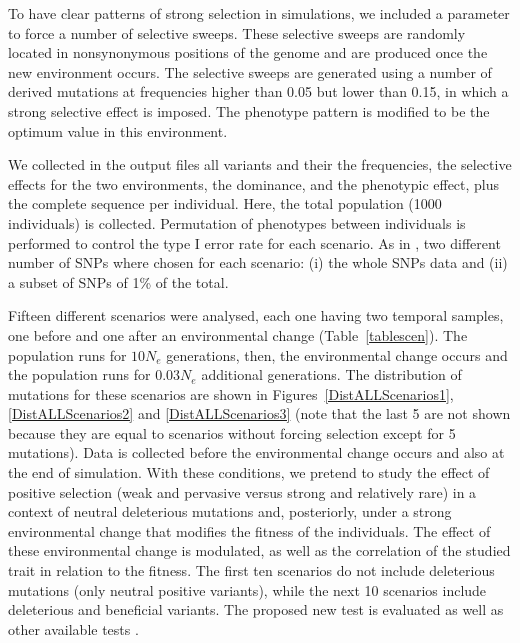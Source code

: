 \documentclass[a4paper,11pt]{article}
\begin{document}
To have clear patterns of strong selection in simulations, we included a parameter to force a number of selective sweeps. These selective sweeps are randomly located in  nonsynonymous positions of the genome and are produced once the new environment occurs. The selective sweeps are generated using a number of derived mutations at frequencies higher than 0.05 but lower than 0.15, in which a strong selective effect is imposed. The phenotype pattern is modified to be the optimum value in this environment. %

We collected in the output files all variants and their the frequencies, the selective effects for the two environments, the dominance, and the phenotypic effect, plus the complete sequence per individual. Here, the total population (1000 individuals) is collected. 
Permutation of phenotypes between individuals is performed to control the type I error rate for each scenario. As in \citep{Caballero:2015aa}, two different number of SNPs where chosen for each scenario: (i) the whole SNPs data and (ii) a subset of SNPs of 1\% of the total.

Fifteen different scenarios were analysed, each one having two temporal samples, one before and one after an environmental change (Table~\ref{tablescen}). The population runs for $10 N_e$ generations, then, the environmental change occurs and the population runs for $0.03N_e$ additional generations. The distribution of mutations for these scenarios are shown in Figures~\ref{DistALLScenarios1}, \ref{DistALLScenarios2} and \ref{DistALLScenarios3} (note that the last 5 are not shown because they are equal to scenarios without forcing selection except for 5 mutations). Data is collected before the environmental change occurs and also at the end of simulation. With these conditions, we pretend to study the effect of positive selection (weak and pervasive versus strong and relatively rare) in a context of neutral deleterious mutations and, posteriorly, under a strong environmental change that modifies the fitness of the individuals. The effect of these environmental change is modulated, as well as the correlation of the studied trait in relation to the fitness. The first ten scenarios do not include deleterious mutations (only neutral positive variants), while the next 10 scenarios include deleterious and beneficial variants. The proposed new test is evaluated as well as other available tests  \citep{Beissinger:2018aa,Uricchio:2019aa,Zeng752527}.
 
\end{document}
